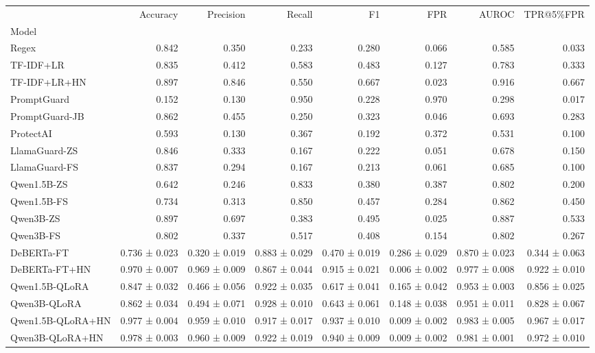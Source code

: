 \begin{tabular}{lrrrrrrr}
\toprule
 & Accuracy & Precision & Recall & F1 & FPR & AUROC & TPR@5\%FPR \\
Model &  &  &  &  &  &  &  \\
\midrule
Regex & 0.842 & 0.350 & 0.233 & 0.280 & 0.066 & 0.585 & 0.033 \\
TF-IDF+LR & 0.835 & 0.412 & 0.583 & 0.483 & 0.127 & 0.783 & 0.333 \\
TF-IDF+LR+HN & 0.897 & 0.846 & 0.550 & 0.667 & 0.023 & 0.916 & 0.667 \\
PromptGuard & 0.152 & 0.130 & 0.950 & 0.228 & 0.970 & 0.298 & 0.017 \\
PromptGuard-JB & 0.862 & 0.455 & 0.250 & 0.323 & 0.046 & 0.693 & 0.283 \\
ProtectAI & 0.593 & 0.130 & 0.367 & 0.192 & 0.372 & 0.531 & 0.100 \\
LlamaGuard-ZS & 0.846 & 0.333 & 0.167 & 0.222 & 0.051 & 0.678 & 0.150 \\
LlamaGuard-FS & 0.837 & 0.294 & 0.167 & 0.213 & 0.061 & 0.685 & 0.100 \\
Qwen1.5B-ZS & 0.642 & 0.246 & 0.833 & 0.380 & 0.387 & 0.802 & 0.200 \\
Qwen1.5B-FS & 0.734 & 0.313 & 0.850 & 0.457 & 0.284 & 0.862 & 0.450 \\
Qwen3B-ZS & 0.897 & 0.697 & 0.383 & 0.495 & 0.025 & 0.887 & 0.533 \\
Qwen3B-FS & 0.802 & 0.337 & 0.517 & 0.408 & 0.154 & 0.802 & 0.267 \\
DeBERTa-FT & 0.736 ± 0.023 & 0.320 ± 0.019 & 0.883 ± 0.029 & 0.470 ± 0.019 & 0.286 ± 0.029 & 0.870 ± 0.023 & 0.344 ± 0.063 \\
DeBERTa-FT+HN & 0.970 ± 0.007 & 0.969 ± 0.009 & 0.867 ± 0.044 & 0.915 ± 0.021 & 0.006 ± 0.002 & 0.977 ± 0.008 & 0.922 ± 0.010 \\
Qwen1.5B-QLoRA & 0.847 ± 0.032 & 0.466 ± 0.056 & 0.922 ± 0.035 & 0.617 ± 0.041 & 0.165 ± 0.042 & 0.953 ± 0.003 & 0.856 ± 0.025 \\
Qwen3B-QLoRA & 0.862 ± 0.034 & 0.494 ± 0.071 & 0.928 ± 0.010 & 0.643 ± 0.061 & 0.148 ± 0.038 & 0.951 ± 0.011 & 0.828 ± 0.067 \\
Qwen1.5B-QLoRA+HN & 0.977 ± 0.004 & 0.959 ± 0.010 & 0.917 ± 0.017 & 0.937 ± 0.010 & 0.009 ± 0.002 & 0.983 ± 0.005 & 0.967 ± 0.017 \\
Qwen3B-QLoRA+HN & 0.978 ± 0.003 & 0.960 ± 0.009 & 0.922 ± 0.019 & 0.940 ± 0.009 & 0.009 ± 0.002 & 0.981 ± 0.001 & 0.972 ± 0.010 \\
\bottomrule
\end{tabular}


